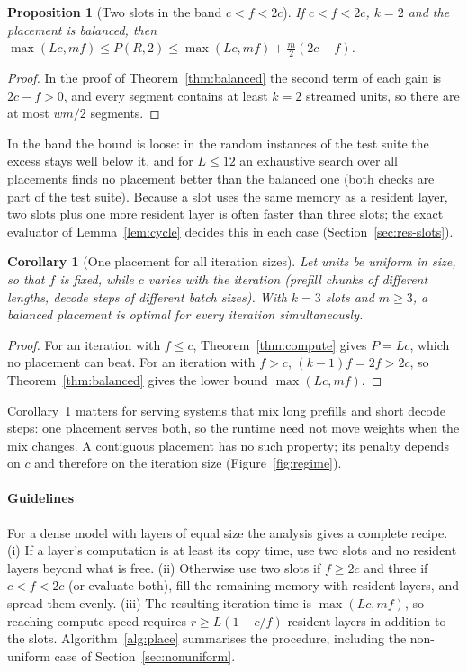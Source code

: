 \documentclass[final,5p,times,twocolumn]{elsarticle}
\newtheorem{proposition}{Proposition}
\newtheorem{corollary}{Corollary}
\theoremstyle{definition}
\newcommand{\Res}{R}
\newcommand{\per}{P}
\begin{document}
\begin{proposition}[Two slots in the band $c<f<2c$]\label{prop:two}
If $c<f<2c$, $k=2$ and the placement is balanced, then $\max(Lc,mf)\le\per(\Res,2)\le\max(Lc,mf)+\tfrac{m}{2}(2c-f)$.
\end{proposition}
\begin{proof}
In the proof of Theorem~\ref{thm:balanced} the second term of each gain is $2c-f>0$, and every segment contains at least $k=2$ streamed units, so there are at most $wm/2$ segments.
\end{proof}

In the band the bound is loose: in the random instances of the test suite the excess stays well below it, and for $L\le12$ an exhaustive search over all placements finds no placement better than the balanced one (both checks are part of the test suite). Because a slot uses the same memory as a resident layer, two slots plus one more resident layer is often faster than three slots; the exact evaluator of Lemma~\ref{lem:cycle} decides this in each case (Section~\ref{sec:res-slots}).

\begin{corollary}[One placement for all iteration sizes]\label{cor:robust}
Let units be uniform in size, so that $f$ is fixed, while $c$ varies with the iteration (prefill chunks of different lengths, decode steps of different batch sizes). With $k=3$ slots and $m\ge3$, a balanced placement is optimal for every iteration simultaneously.
\end{corollary}
\begin{proof}
For an iteration with $f\le c$, Theorem~\ref{thm:compute} gives $\per=Lc$, which no placement can beat. For an iteration with $f>c$, $(k-1)f=2f>2c$, so Theorem~\ref{thm:balanced} gives the lower bound $\max(Lc,mf)$.
\end{proof}

Corollary~\ref{cor:robust} matters for serving systems that mix long prefills and short decode steps: one placement serves both, so the runtime need not move weights when the mix changes. A contiguous placement has no such property; its penalty depends on $c$ and therefore on the iteration size (Figure~\ref{fig:regime}).

\paragraph{Guidelines}
For a dense model with layers of equal size the analysis gives a complete recipe. (i) If a layer's computation is at least its copy time, use two slots and no resident layers beyond what is free. (ii) Otherwise use two slots if $f\ge2c$ and three if $c<f<2c$ (or evaluate both), fill the remaining memory with resident layers, and spread them evenly. (iii) The resulting iteration time is $\max(Lc,mf)$, so reaching compute speed requires $r\ge L(1-c/f)$ resident layers in addition to the slots. Algorithm~\ref{alg:place} summarises the procedure, including the non-uniform case of Section~\ref{sec:nonuniform}.
\end{document}
